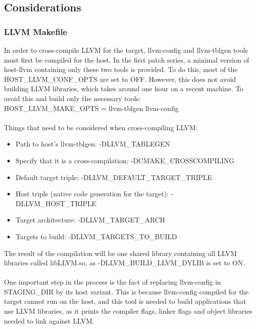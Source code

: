 \documentclass[12pt,a4paper,oneside]{article}
\begin{document}
\subsection*{Considerations}

\subsubsection*{LLVM Makefile}
In order to cross-compile LLVM for the target, llvm-config and llvm-tblgen tools
must first be compiled for the host. In the first patch series, a minimal version of
host-llvm containing only these two tools is provided. To do this, most of the
{\selectfont HOST\_LLVM\_CONF\_OPTS} are set to OFF. However,
this does not avoid building LLVM libraries, which takes around one hour on a
recent machine. To avoid this and build only the necessary tools:\\
{\selectfont HOST\_LLVM\_MAKE\_OPTS = llvm-tblgen llvm-config}\\\\
Things that need to be considered when cross-compiling LLVM:
\begin{itemize}
  \item Path to host's llvm-tblgen: {\selectfont
  -DLLVM\_TABLEGEN}
  \item Specify that it is a cross-compilation: {\selectfont
  -DCMAKE\_CROSSCOMPILING}
  \item Default target triple: {\selectfont
  -DLLVM\_DEFAULT\_TARGET\_TRIPLE}
  \item Host triple (native code generation for the target): {\selectfont
  -DLLVM\_HOST\_TRIPLE}
  \item Target architecture: {\selectfont
  -DLLVM\_TARGET\_ARCH}
  \item Targets to build: {\selectfont
  -DLLVM\_TARGETS\_TO\_BUILD}
\end{itemize}
The result of the compilation will be one shared library containing all LLVM
libraries called libLLVM.so, as {\selectfont
-DLLVM\_BUILD\_LLVM\_DYLIB} is set to ON.\\\\
One important step in the process is the fact of replacing llvm-config in STAGING\_DIR
by its host variant. This is because llvm-config compiled for the target cannot
run on the host, and this tool is needed to build applications that use LLVM libraries,
as it prints the compiler flags, linker flags and object libraries needed to link
against LLVM.
\end{document}
